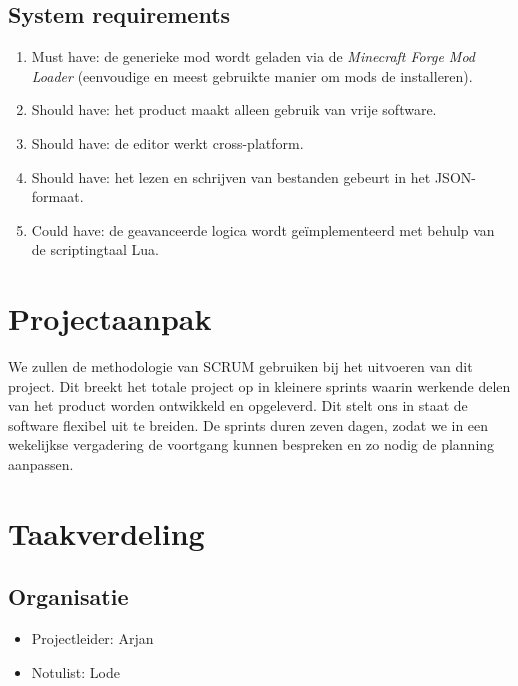 \documentclass{article}
\begin{document}
	\subsection{System requirements}
	\begin{enumerate}
		\item Must have: de generieke mod wordt geladen via de \emph{Minecraft Forge Mod Loader} (eenvoudige en meest gebruikte manier om mods de installeren).
		
		\item Should have: het product maakt alleen gebruik van vrije software.
		\item Should have: de editor werkt cross-platform.
		\item Should have: het lezen en schrijven van bestanden gebeurt in het JSON-formaat.
		
		\item Could have: de geavanceerde logica wordt ge\"implementeerd met behulp van de scriptingtaal Lua.
	\end{enumerate}

\newpage

\section{Projectaanpak}
	We zullen de methodologie van SCRUM gebruiken bij het uitvoeren van dit project. Dit breekt het totale project op in kleinere sprints waarin werkende delen van het product worden ontwikkeld en opgeleverd. Dit stelt ons in staat de software flexibel uit te breiden. De sprints duren zeven dagen, zodat we in een wekelijkse vergadering de voortgang kunnen bespreken en zo nodig de planning aanpassen.
	
\section{Taakverdeling}
	\subsection{Organisatie}
	\begin{itemize}
		\item Projectleider: Arjan
		\item Notulist: Lode
	\end{itemize}
\end{document}
